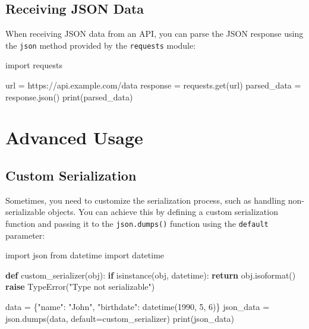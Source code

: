 \documentclass[
  letterpaper,
  DIV=11,
  numbers=noendperiod]{scrreprt}
\newenvironment{Shaded}{\begin{snugshade}}{\end{snugshade}}
\newcommand{\BuiltInTok}[1]{\textcolor[rgb]{0.00,0.23,0.31}{#1}}
\newcommand{\ControlFlowTok}[1]{\textcolor[rgb]{0.00,0.23,0.31}{\textbf{#1}}}
\newcommand{\DecValTok}[1]{\textcolor[rgb]{0.68,0.00,0.00}{#1}}
\newcommand{\ImportTok}[1]{\textcolor[rgb]{0.00,0.46,0.62}{#1}}
\newcommand{\KeywordTok}[1]{\textcolor[rgb]{0.00,0.23,0.31}{\textbf{#1}}}
\newcommand{\NormalTok}[1]{\textcolor[rgb]{0.00,0.23,0.31}{#1}}
\newcommand{\OperatorTok}[1]{\textcolor[rgb]{0.37,0.37,0.37}{#1}}
\newcommand{\PreprocessorTok}[1]{\textcolor[rgb]{0.68,0.00,0.00}{#1}}
\newcommand{\StringTok}[1]{\textcolor[rgb]{0.13,0.47,0.30}{#1}}
\begin{document}
\subsection{Receiving JSON Data}\label{receiving-json-data}

When receiving JSON data from an API, you can parse the JSON response
using the \texttt{json} method provided by the \texttt{requests} module:

\begin{Shaded}
\begin{Highlighting}[]
\ImportTok{import}\NormalTok{ requests}

\NormalTok{url }\OperatorTok{=} \StringTok{\textquotesingle{}https://api.example.com/data\textquotesingle{}}
\NormalTok{response }\OperatorTok{=}\NormalTok{ requests.get(url)}
\NormalTok{parsed\_data }\OperatorTok{=}\NormalTok{ response.json()}
\BuiltInTok{print}\NormalTok{(parsed\_data)}
\end{Highlighting}
\end{Shaded}

\section{Advanced Usage}\label{advanced-usage-1}

\subsection{Custom Serialization}\label{custom-serialization}

Sometimes, you need to customize the serialization process, such as
handling non-serializable objects. You can achieve this by defining a
custom serialization function and passing it to the
\texttt{json.dumps()} function using the \texttt{default} parameter:

\begin{Shaded}
\begin{Highlighting}[]
\ImportTok{import}\NormalTok{ json}
\ImportTok{from}\NormalTok{ datetime }\ImportTok{import}\NormalTok{ datetime}

\KeywordTok{def}\NormalTok{ custom\_serializer(obj):}
    \ControlFlowTok{if} \BuiltInTok{isinstance}\NormalTok{(obj, datetime):}
        \ControlFlowTok{return}\NormalTok{ obj.isoformat()}
    \ControlFlowTok{raise} \PreprocessorTok{TypeError}\NormalTok{(}\StringTok{"Type not serializable"}\NormalTok{)}

\NormalTok{data }\OperatorTok{=}\NormalTok{ \{}\StringTok{"name"}\NormalTok{: }\StringTok{"John"}\NormalTok{, }\StringTok{"birthdate"}\NormalTok{: datetime(}\DecValTok{1990}\NormalTok{, }\DecValTok{5}\NormalTok{, }\DecValTok{6}\NormalTok{)\}}
\NormalTok{json\_data }\OperatorTok{=}\NormalTok{ json.dumps(data, default}\OperatorTok{=}\NormalTok{custom\_serializer)}
\BuiltInTok{print}\NormalTok{(json\_data)}
\end{Highlighting}
\end{Shaded}
\end{document}
